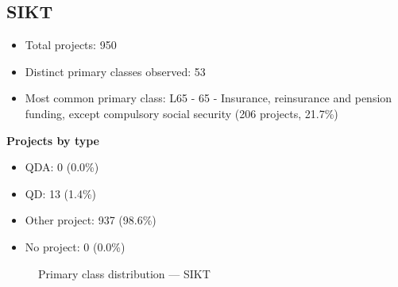 \subsection{SIKT}

\begin{itemize}
    \item Total projects: 950
    \item Distinct primary classes observed: 53
    \item Most common primary class: L65 - 65 - Insurance, reinsurance and pension funding, except compulsory social security (206 projects, 21.7\%)
\end{itemize}
\textbf{Projects by type}
\begin{itemize}
    \item QDA: 0 (0.0\%)
    \item QD: 13 (1.4\%)
    \item Other project: 937 (98.6\%)
    \item No project: 0 (0.0\%)
\end{itemize}

\begin{figure}[h]
    \centering
    
    \caption{Primary class distribution --- SIKT}
\end{figure}

